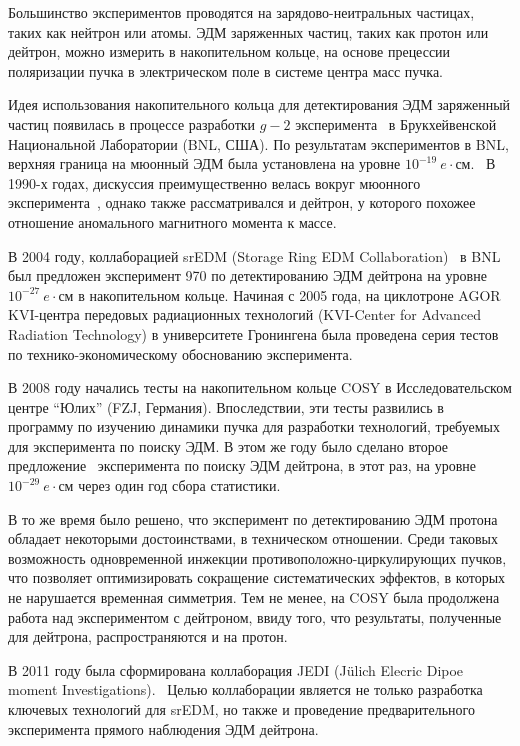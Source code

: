 Большинство экспериментов проводятся на зарядово-неитральных частицах, таких как нейтрон или атомы. ЭДМ заряженных частиц, таких как протон или дейтрон, можно измерить в накопительном кольце, на основе прецессии поляризации пучка в электрическом поле в системе центра масс пучка.

Идея использования накопительного кольца для детектирования ЭДМ заряженный частиц появилась в процессе разработки $g-2$ эксперимента~\cite{BNL:g-2:2001} в Брукхейвенской Национальной Лаборатории (BNL, США). По результатам экспериментов в BNL, верхняя граница на мюонный ЭДМ была установлена на уровне $10^{-19}~e\cdot$см.~\cite{BNL:muon_ANA:2009} В 1990-х годах, дискуссия преимущественно велась вокруг мюонного эксперимента~\cite{Farley:SREDM:Muon}, однако также рассматривался и дейтрон, у которого похожее отношение аномального магнитного момента к массе.

В 2004 году, коллаборацией srEDM (Storage Ring EDM Collaboration)~\cite{BNL:SREDM} в BNL был предложен эксперимент 970 по детектированию ЭДМ дейтрона на уровне $10^{-27}~e\cdot$см в накопительном кольце. Начиная с 2005 года, на циклотроне AGOR KVI-центра передовых радиационных технологий (KVI-Center for Advanced Radiation Technology) в университете Гронингена была проведена серия тестов по технико-экономическому обоснованию эксперимента.

В 2008 году начались тесты на накопительном кольце COSY в Исследовательском центре ``Юлих'' (FZJ, Германия). Впоследствии, эти тесты развились в программу по изучению динамики пучка для разработки технологий, требуемых для эксперимента по поиску ЭДМ. В этом же году было сделано второе предложение~\cite{BNL:Deuteron2008} эксперимента по поиску ЭДМ дейтрона, в этот раз, на уровне $10^{-29}~e\cdot$см через один год сбора статистики.

В то же время было решено, что эксперимент по детектированию ЭДМ протона обладает некоторыми достоинствами, в техническом отношении. Среди таковых возможность одновременной инжекции противоположно-циркулирующих пучков, что позволяет оптимизировать сокращение систематических эффектов, в которых не нарушается временная симметрия. Тем не менее, на COSY была продолжена работа над экспериментом с дейтроном, ввиду того, что результаты, полученные для дейтрона, распространяются и на протон.

В 2011 году была сформирована коллаборация JEDI (J\"ulich Elecric Dipoe moment Investigations).~\cite{JEDI:Website} Целью коллаборации является не только разработка ключевых технологий для srEDM, но также и проведение предварительного эксперимента прямого наблюдения ЭДМ дейтрона. 

